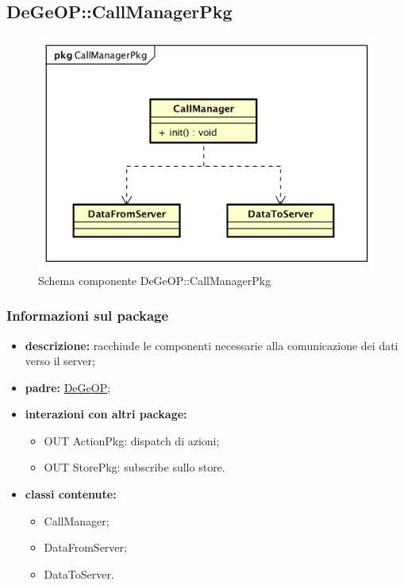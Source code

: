 \subsection{DeGeOP::CallManagerPkg}
\label{pkg::CallManagerPkg}
\begin{figure}[H]
	\centering
	\includegraphics[width=\textwidth]{img/PkgDiagram/STCallManagerPkg.png}
	\caption{Schema componente DeGeOP::CallManagerPkg}
\end{figure}
\subsubsection{Informazioni sul package}
\begin{itemize}
	\item \textbf{descrizione:} racchiude le componenti necessarie alla comunicazione dei dati verso il server;
	\item \textbf{padre:} \hyperref[pkg::DeGeOP]{DeGeOP};
	\item \textbf{interazioni con altri package:} 
	\begin{itemize}
		\item OUT ActionPkg: dispatch di azioni;
		\item OUT StorePkg: subscribe sullo store.
	\end{itemize}
	\item \textbf{classi contenute:}
	\begin{itemize}
		\item CallManager;
		\item DataFromServer;
		\item DataToServer.
	\end{itemize}
\end{itemize}
